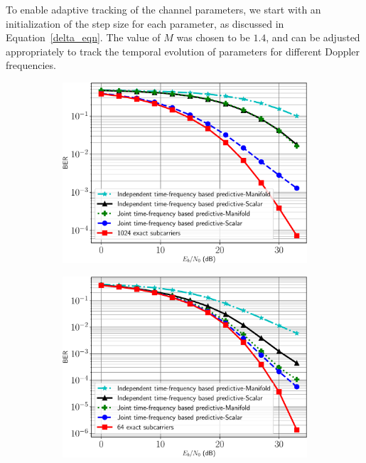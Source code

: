 \documentclass[11pt,a4paper]{report}
\begin{document}
To enable adaptive tracking of the channel parameters, we start with
an initialization of the step size for each parameter, as discussed in
Equation~\ref{delta_eqn}. The value of $M$ was chosen to be $1.4$, and
can be adjusted appropriately to track the temporal evolution of
parameters for different Doppler frequencies.
\begin{figure}
\begin{subfigure}[b]{0.5\columnwidth}
\includegraphics[width=\columnwidth]{images/1024final_withtime.pdf}
    \caption{}
\label{fig:ber_ped}
\end{subfigure}
\begin{subfigure}[b]{0.5\columnwidth}
\includegraphics[width=\columnwidth]{images/64final_withtime.pdf}

\end{subfigure}
\end{figure}
\end{document}
